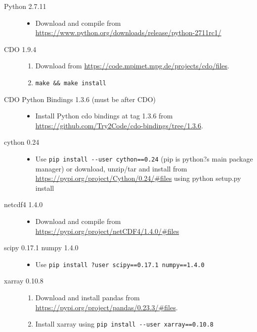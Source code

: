 \documentclass{article}
\begin{document}
\begin{description}
\item[Python 2.7.11] \hfill
\begin{itemize} 
\item Download and compile from \\ \url{https://www.python.org/downloads/release/python-2711rc1/}
\end{itemize} 
\item[CDO 1.9.4] \hfill
\begin{enumerate} 	
\item Download from \url{https://code.mpimet.mpg.de/projects/cdo/files}.
\item \lstinline[style=bash_input]{make && make install}
\end{enumerate} 
\item[CDO Python Bindings 1.3.6 (must be after CDO)]\hfill
\begin{itemize} 
\item Install Python cdo bindings at tag 1.3.6 from \url{https://github.com/Try2Code/cdo-bindings/tree/1.3.6}.
\end{itemize} 
\item[cython 0.24] \hfill
\begin{itemize} 
\item Use \lstinline[style=bash_input]{pip install --user cython==0.24} (pip is python?s main package manager) or download, unzip/tar and install from \url{https://pypi.org/project/Cython/0.24/#files} using python setup.py install
\end{itemize} 
\item[netcdf4 1.4.0] \hfill
\begin{itemize} 
\item Download and compile from \url{https://pypi.org/project/netCDF4/1.4.0/#files}
\end{itemize} 
\item[scipy 0.17.1 numpy 1.4.0]\hfill
\begin{itemize} 
\item Use \lstinline[style=bash_input]{pip install ?user scipy==0.17.1 numpy==1.4.0}
\end{itemize} 
\item[xarray 0.10.8]\hfill
\begin{enumerate}  
\item Download and install pandas from \url{https://pypi.org/project/pandas/0.23.3/#files}.
\item Install xarray using  \lstinline[style=bash_input]{pip install --user xarray==0.10.8}

\end{enumerate}
\end{description}
\end{document}
